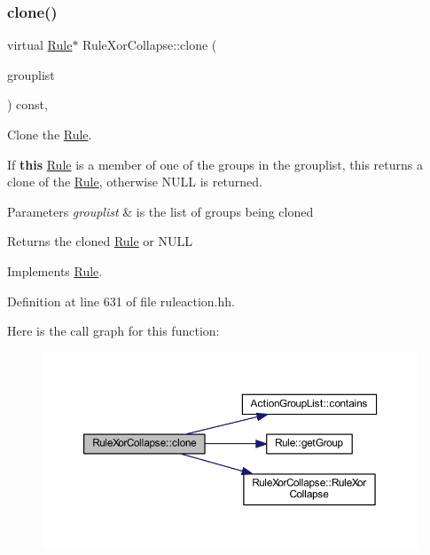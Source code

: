 \subsubsection{\texorpdfstring{clone()}{clone()}}
{\footnotesize\ttfamily virtual \mbox{\hyperlink{class_rule}{Rule}}$\ast$ Rule\+Xor\+Collapse\+::clone (\begin{DoxyParamCaption}\item[{const \mbox{\hyperlink{class_action_group_list}{Action\+Group\+List}} \&}]{grouplist }\end{DoxyParamCaption}) const\hspace{0.3cm}{\ttfamily [inline]}, {\ttfamily [virtual]}}



Clone the \mbox{\hyperlink{class_rule}{Rule}}. 

If {\bfseries{this}} \mbox{\hyperlink{class_rule}{Rule}} is a member of one of the groups in the grouplist, this returns a clone of the \mbox{\hyperlink{class_rule}{Rule}}, otherwise N\+U\+LL is returned. 
\begin{DoxyParams}{Parameters}
{\em grouplist} & is the list of groups being cloned \\
\hline
\end{DoxyParams}
\begin{DoxyReturn}{Returns}
the cloned \mbox{\hyperlink{class_rule}{Rule}} or N\+U\+LL 
\end{DoxyReturn}


Implements \mbox{\hyperlink{class_rule_a70de90a76461bfa7ea0b575ce3c11e4d}{Rule}}.



Definition at line 631 of file ruleaction.\+hh.

Here is the call graph for this function\+:
\nopagebreak
\begin{figure}[H]
\begin{center}
\leavevmode
\includegraphics[width=350pt]{class_rule_xor_collapse_a48b66467d8d326b7c4da8f6eb3110970_cgraph}
\end{center}
\end{figure}
\mbox{\label{class_rule_xor_collapse_ab744a2a37f1908003ac8ef28ab2614f5}} 
